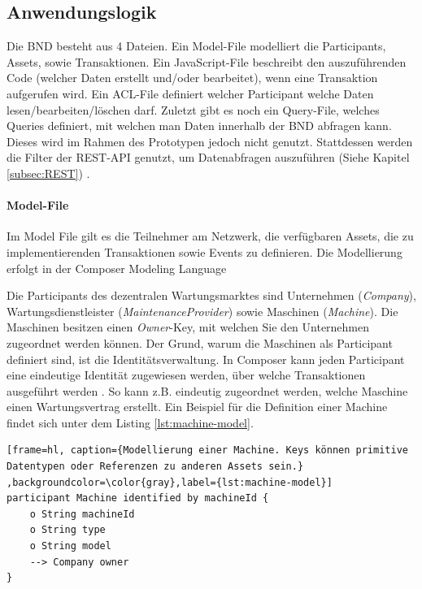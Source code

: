 \subsection{Anwendungslogik}
Die BND besteht aus 4 Dateien. Ein Model-File modelliert die Participants, Assets, sowie Transaktionen. Ein JavaScript-File beschreibt den auszuführenden Code (welcher Daten erstellt und/oder bearbeitet), wenn eine Transaktion aufgerufen wird. Ein ACL-File definiert welcher Participant welche Daten lesen/bearbeiten/löschen darf. Zuletzt gibt es noch ein Query-File, welches Queries definiert, mit welchen man Daten innerhalb der BND abfragen kann. Dieses wird im Rahmen des Prototypen jedoch nicht genutzt. Stattdessen werden die Filter der REST-API genutzt, um Datenabfragen auszuführen (Siehe Kapitel \ref{subsec:REST}) \cite{HyperledgerComposerTeamIntroductionHyperledgerComposer}.

\paragraph{Model-File}
Im Model File gilt es die Teilnehmer am Netzwerk, die verfügbaren Assets, die zu implementierenden Transaktionen sowie Events zu definieren. Die Modellierung erfolgt in der Composer Modeling Language \cite{ModelingLanguageHyperledger}

Die Participants des dezentralen Wartungsmarktes sind Unternehmen (\textit{Company}), Wartungsdienstleister (\textit{MaintenanceProvider}) sowie Maschinen (\textit{Machine}). Die Maschinen besitzen einen \textit{Owner}-Key, mit welchen Sie den Unternehmen zugeordnet werden können. Der Grund, warum die Maschinen als Participant definiert sind, ist die Identitätsverwaltung. In Composer kann jeden Participant eine eindeutige Identität zugewiesen werden, über welche Transaktionen ausgeführt werden \cite{ParticipantsidentitiesHyperledger}. So kann z.B. eindeutig zugeordnet werden, welche Maschine einen Wartungsvertrag erstellt. Ein Beispiel für die Definition einer Machine findet sich unter dem Listing \ref{lst:machine-model}.

\begin{lstfloat}
\begin{lstlisting}[frame=hl, caption={Modellierung einer Machine. Keys können primitive Datentypen oder Referenzen zu anderen Assets sein.} ,backgroundcolor=\color{gray},label={lst:machine-model}]
participant Machine identified by machineId {
    o String machineId
    o String type
    o String model
    --> Company owner
}
\end{lstlisting} 
\end{lstfloat}

